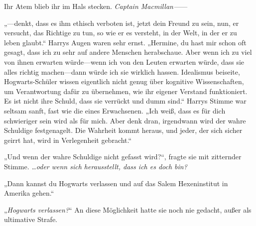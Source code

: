 Ihr Atem blieb ihr im Hals stecken. \emph{Captain Macmillan—}—

„—denkt, dass es ihm ethisch verboten ist, jetzt dein Freund zu sein, nun, er versucht, das Richtige zu tun, so wie er es versteht, in der Welt, in der er zu leben glaubt.“
Harrys Augen waren sehr ernst. „Hermine, du hast mir schon oft gesagt, dass ich zu sehr auf andere Menschen herabschaue. Aber wenn ich zu viel von ihnen erwarten würde—wenn ich von den Leuten erwarten würde, dass sie alles richtig machen—dann würde ich sie wirklich hassen. Idealismus beiseite, Hogwarts-Schüler wissen eigentlich nicht genug über kognitive Wissenschaften, um Verantwortung dafür zu übernehmen, wie ihr eigener Verstand funktioniert. Es ist nicht ihre Schuld, dass sie verrückt und dumm sind.“
Harrys Stimme war seltsam sanft, fast wie die eines Erwachsenen.
„Ich weiß, dass es für dich schwieriger sein wird als für mich. Aber denk dran, irgendwann wird der wahre Schuldige festgenagelt. Die Wahrheit kommt heraus, und jeder, der sich sicher geirrt hat, wird in Verlegenheit gebracht.“


„Und wenn der wahre Schuldige nicht gefasst wird?“, fragte sie mit zitternder Stimme. \emph{…oder wenn sich herausstellt, dass ich es doch bin?}

„Dann kannst du Hogwarts verlassen und auf das Salem Hexeninstitut in Amerika gehen.“

„\emph{Hogwarts verlassen?}“ An diese Möglichkeit hatte sie noch nie gedacht, außer als ultimative Strafe.

